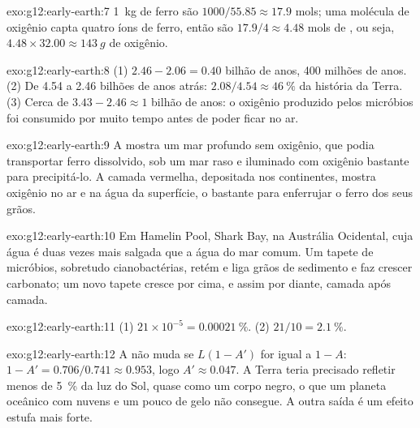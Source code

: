 \begin{solution}{exo:g12:early-earth:7}
\qty{1}{kg} de ferro são $1000/55.85 \approx 17.9$ mols; uma molécula de
oxigênio capta quatro íons de ferro, então são $17.9/4 \approx 4.48$ mols de
, ou seja, $4.48 \times 32.00 \approx \qty{143}{g}$ de oxigênio.
\end{solution}

\begin{solution}{exo:g12:early-earth:8}
(1) $2.46 - 2.06 = 0.40$ bilhão de anos, 400 milhões de anos. (2) De 4.54
a 2.46 bilhões de anos atrás: $2.08/4.54 \approx \qty{46}{\percent}$ da
história da Terra. (3) Cerca de $3.43 - 2.46 \approx 1$ bilhão de anos: o
oxigênio produzido pelos micróbios foi consumido por muito tempo antes de
poder ficar no ar.
\end{solution}

\begin{solution}{exo:g12:early-earth:9}
A  mostra um mar profundo sem oxigênio, que podia
transportar ferro dissolvido, sob um mar raso e iluminado com oxigênio
bastante para precipitá-lo. A camada vermelha, depositada nos continentes,
mostra oxigênio no ar e na água da superfície, o bastante para enferrujar o
ferro dos seus grãos.
\end{solution}

\begin{solution}{exo:g12:early-earth:10}
Em Hamelin Pool, Shark Bay, na Austrália Ocidental, cuja água é duas vezes
mais salgada que a água do mar comum. Um tapete de micróbios, sobretudo
cianobactérias, retém e liga grãos de sedimento e faz crescer carbonato; um
novo tapete cresce por cima, e assim por diante, camada após camada.
\end{solution}

\begin{solution}{exo:g12:early-earth:11}
(1) $21 \times 10^{-5} = \qty{0.00021}{\percent}$. (2) $21/10 =
\qty{2.1}{\percent}$.
\end{solution}

\begin{solution}{exo:g12:early-earth:12}
A  não muda se $L(1 - A')$ for igual a $1 - A$:
$1 - A' = 0.706/0.741 \approx 0.953$, logo $A' \approx 0.047$. A Terra teria
precisado refletir menos de \qty{5}{\percent} da luz do Sol, quase como um
corpo negro, o que um planeta oceânico com nuvens e um pouco de gelo não
consegue. A outra saída é um efeito estufa mais forte.
\end{solution}

